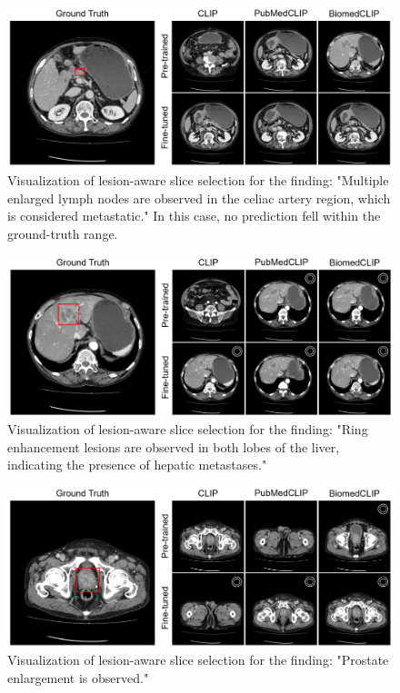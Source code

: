 \documentclass[bioengineering,article,submit,pdftex,moreauthors]{Definitions/mdpi}
\begin{document}
\begin{figure}[ht]
  \centering
  \includegraphics[width=1\textwidth]{./figures/app_lesion_aware_inst7_2.png}
  \caption{Visualization of lesion-aware slice selection for the finding: "Multiple enlarged lymph nodes are observed in the celiac artery region, which is considered metastatic."
  In this case, no prediction fell within the ground-truth range.}
  \label{fig:lesion_aware_inst7}
\end{figure}


\begin{figure}[ht]
  \centering
  \includegraphics[width=1\textwidth]{./figures/app_lesion_aware_inst8_2.png}
  \caption{Visualization of lesion-aware slice selection for the finding: 
"Ring enhancement lesions are observed in both lobes of the liver, indicating the presence of hepatic metastases."}
  \label{fig:lesion_aware_inst8}
\end{figure}


\begin{figure}[ht]
  \centering
  \includegraphics[width=1\textwidth]{./figures/app_lesion_aware_inst10_2.png}
  \caption{Visualization of lesion-aware slice selection for the finding: "Prostate enlargement is observed."}
  \label{fig:lesion_aware_inst10}
\end{figure}
\end{document}
